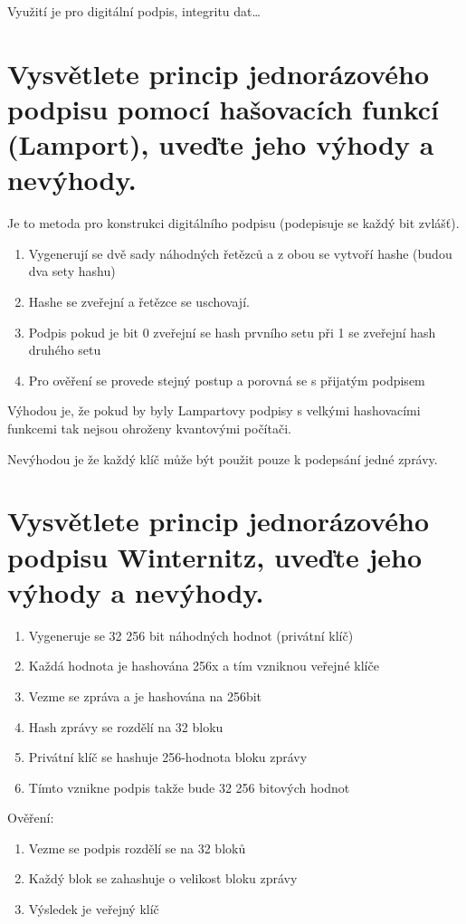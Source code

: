 Využití je pro digitální podpis, integritu dat\dots

\section{Vysvětlete princip jednorázového podpisu pomocí hašovacích funkcí (Lamport), uveďte jeho výhody a nevýhody.}

Je to metoda pro konstrukci digitálního podpisu (podepisuje se každý bit zvlášť).
\begin{enumerate}
    \item Vygenerují se dvě sady náhodných řetězců a z obou se vytvoří hashe (budou dva sety hashu)
    \item Hashe se zveřejní a řetězce se uschovají.
    \item Podpis pokud je bit 0 zveřejní se hash prvního setu při 1 se zveřejní hash druhého setu
    \item Pro ověření se provede stejný postup a porovná se s přijatým podpisem
\end{enumerate}

Výhodou je, že pokud by byly Lampartovy podpisy s velkými hashovacími funkcemi tak nejsou ohroženy kvantovými počítači.

Nevýhodou je že každý klíč může být použit pouze k podepsání jedné zprávy.

\section{Vysvětlete princip jednorázového podpisu Winternitz, uveďte jeho výhody a nevýhody.}

\begin{enumerate}
    \item Vygeneruje se 32 256 bit náhodných hodnot (privátní klíč)
    \item Každá hodnota je hashována 256x a tím vzniknou veřejné klíče
    \item Vezme se zpráva a je hashována na 256bit
    \item Hash zprávy se rozdělí na 32 bloku
    \item Privátní klíč se hashuje 256-hodnota bloku zprávy
    \item Tímto vznikne podpis takže bude 32 256 bitových hodnot
\end{enumerate}

Ověření:
\begin{enumerate}
    \item Vezme se podpis rozdělí se na 32 bloků
    \item Každý blok se zahashuje o velikost bloku zprávy
    \item Výsledek je veřejný klíč
\end{enumerate}



